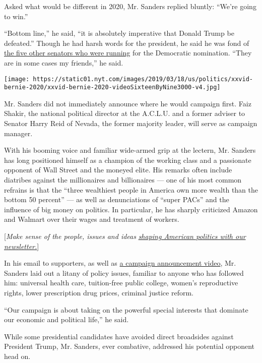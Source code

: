 Asked what would be different in 2020, Mr. Sanders replied bluntly:
``We're going to win.''

``Bottom line,'' he said, ``it is absolutely imperative that Donald
Trump be defeated.'' Though he had harsh words for the president, he
said he was fond of
\href{https://www.nytimes.com/interactive/2019/us/politics/2020-presidential-candidates.html}{the
five other senators who were running} for the Democratic nomination.
``They are in some cases my friends,'' he said.

\texttt{[image: https://static01.nyt.com/images/2019/03/18/us/politics/xxvid-bernie-2020/xxvid-bernie-2020-videoSixteenByNine3000-v4.jpg]}

Mr. Sanders did not immediately announce where he would campaign first.
Faiz Shakir, the national political director at the A.C.L.U. and a
former adviser to Senator Harry Reid of Nevada, the former majority
leader, will serve as campaign manager.

With his booming voice and familiar wide-armed grip at the lectern, Mr.
Sanders has long positioned himself as a champion of the working class
and a passionate opponent of Wall Street and the moneyed elite. His
remarks often include diatribes against the millionaires and
billionaires --- one of his most common refrains is that the ``three
wealthiest people in America own more wealth than the bottom 50
percent'' --- as well as denunciations of ``super PACs'' and the
influence of big money on politics. In particular, he has sharply
criticized Amazon and Walmart over their wages and treatment of workers.

{[}\emph{Make sense of the people, issues and ideas}
\href{https://www.nytimes.com/newsletters/politics?smid=rd?action=click\&module=Intentional\&pgtype=Article}{\emph{shaping
American politics with our newsletter.}}{]}

In his email to supporters, as well as
\href{https://twitter.com/BernieSanders/status/1097828878310096901}{a
campaign announcement video}, Mr. Sanders laid out a litany of policy
issues, familiar to anyone who has followed him: universal health care,
tuition-free public college, women's reproductive rights, lower
prescription drug prices, criminal justice reform.

``Our campaign is about taking on the powerful special interests that
dominate our economic and political life,'' he said.

While some presidential candidates have avoided direct broadsides
against President Trump, Mr. Sanders, ever combative, addressed his
potential opponent head on.


